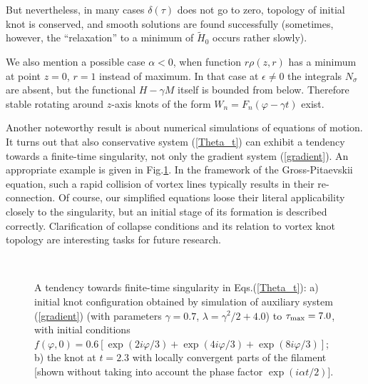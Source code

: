 \documentclass[pra,twocolumn,showpacs]{revtex4}
\begin{document}
But nevertheless, in many cases $\delta(\tau)$ does not go to zero, topology of initial knot
is conserved, and smooth solutions are found successfully (sometimes, however, the ``relaxation'' 
to a minimum of $\tilde H_0$ occurs rather slowly).

We also mention a possible case $\alpha<0$, when function $r\rho(z,r)$ has a minimum at point
$z=0$, $r=1$ instead of maximum. In that case at $\epsilon\neq 0$  the integrals $N_\sigma$ are
absent, but the functional $H-\gamma M$ itself is bounded from below. Therefore stable rotating 
around $z$-axis knots of the form  $W_n=F_n(\varphi-\gamma t)$ exist.

Another noteworthy result is about numerical simulations of equations of motion.
It turns out that also conservative system (\ref{Theta_t}) can exhibit a tendency towards 
a finite-time  singularity, not only the gradient system (\ref{gradient}). An appropriate example 
is given in Fig.\ref{FTS}. In the framework of the Gross-Pitaevskii equation, such a rapid collision
of vortex lines typically results in their re-connection. Of course, our simplified equations loose
their literal applicability closely to the singularity, but an initial stage of its formation is 
described correctly. Clarification of collapse conditions and its relation to vortex knot 
topology are interesting tasks for future research.

\begin{figure}
\begin{center}
\\
\end{center}
\caption{A tendency towards finite-time singularity in Eqs.(\ref{Theta_t}): 
a) initial knot configuration obtained by simulation of auxiliary system (\ref{gradient}) 
(with parameters $\gamma=0.7$, $\lambda=\gamma^2/2+4.0$) to $\tau_{\rm max}=7.0$, with initial conditions 
$f(\varphi,0)=0.6[\exp(2i\varphi/3)+ \exp(4i\varphi/3)+\exp(8i\varphi/3)]$; b) the knot at $t=2.3$
with locally convergent parts of the filament [shown without taking into account the phase factor 
$\exp(i\alpha t/2)$].}
\label{FTS} 
\end{figure}
\end{document}
